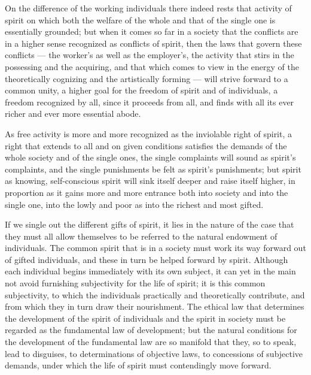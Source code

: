 \documentclass[12pt]{book}
\begin{document}
On the difference of the working individuals there indeed rests that activity of spirit on which
both the welfare of the whole and that of the single one is essentially grounded; but when it comes
so far in a society that the conflicts are in a higher sense recognized as conflicts of spirit, then
the laws that govern these conflicts --- the worker's as well as the employer's, the activity that
stirs in the possessing and the acquiring, and that which comes to view in the energy of the
theoretically cognizing and the artistically forming --- will strive forward to a common unity, a
higher goal for the freedom of spirit and of individuals, a freedom recognized by all, since it
proceeds from all, and finds with all its ever richer and ever more essential abode.

As free activity is more and more recognized as the inviolable right of spirit, a right that
extends to all and on given conditions satisfies the demands of the whole society and of the
single ones, the single complaints will sound as spirit's complaints, and the single punishments
be felt as spirit's punishments; but spirit as knowing, self-conscious spirit will sink itself
deeper and raise itself higher, in proportion as it gains more and more entrance both into society
and into the single one, into the lowly and poor as into the richest and most gifted.

If we single out the different gifts of spirit, it lies in the nature of the case that they must
all allow themselves to be referred to the natural endowment of individuals. The common spirit
that is in a society must work its way forward out of gifted individuals, and these in turn be
helped forward by spirit. Although each individual begins immediately with its own subject, it can
yet in the main not avoid furnishing subjectivity for the life of spirit; it is this common
subjectivity, to which the individuals practically and theoretically contribute, and from which
they in turn draw their nourishment. The ethical law that determines the development of the spirit
of individuals and the spirit in society must be regarded as the fundamental law of development;
but the natural conditions for the development of the fundamental law are so manifold that they, so
to speak, lead to disguises, to determinations of objective laws, to concessions of subjective
demands, under which the life of spirit must contendingly move forward.
\end{document}
